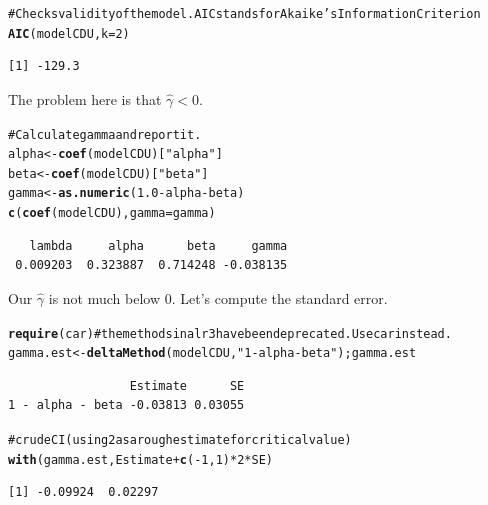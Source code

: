 \documentclass[10pt]{article}\usepackage{graphicx, color}
\makeatletter
\newcommand{\hlfunctioncall}[1]{\textcolor[rgb]{0.501960784313725,0,0.329411764705882}{\textbf{#1}}}%
\newcommand{\hlstring}[1]{\textcolor[rgb]{0.6,0.6,1}{#1}}%
\newcommand{\hlcomment}[1]{\textcolor[rgb]{0.180392156862745,0.6,0.341176470588235}{#1}}%
\newenvironment{kframe}{%
 \def\at@end@of@kframe{}%
 \ifinner\ifhmode%
  \def\at@end@of@kframe{\end{minipage}}%
  \begin{minipage}{\columnwidth}%
 \fi\fi%
 \def\FrameCommand##1{\hskip\@totalleftmargin \hskip-\fboxsep
 \colorbox{shadecolor}{##1}\hskip-\fboxsep
     \hskip-\linewidth \hskip-\@totalleftmargin \hskip\columnwidth}%
 \MakeFramed {\advance\hsize-\width
   \@totalleftmargin\z@ \linewidth\hsize
   \@setminipage}}%
 {\par\unskip\endMakeFramed%
 \at@end@of@kframe}
\newenvironment{knitrout}{}{} %
\makeatother
\begin{document}
\begin{knitrout}
\color{fgcolor}\begin{kframe}
\begin{alltt}
\hlcomment{# Checks validity of the model. AIC stands for Akaike's Information Criterion}
\hlfunctioncall{AIC}(modelCDU, k=2)
\end{alltt}
\begin{verbatim}
[1] -129.3
\end{verbatim}
\end{kframe}
\end{knitrout}


The problem here is that $\hat \gamma < 0$.
\begin{knitrout}
\color{fgcolor}\begin{kframe}
\begin{alltt}
\hlcomment{# Calculate gamma and report it.}
alpha <- \hlfunctioncall{coef}(modelCDU)[\hlstring{"alpha"}] 
beta <- \hlfunctioncall{coef}(modelCDU)[\hlstring{"beta"}] 
gamma <- \hlfunctioncall{as.numeric}(1.0 - alpha - beta)
\hlfunctioncall{c}(\hlfunctioncall{coef}(modelCDU), gamma=gamma)
\end{alltt}
\begin{verbatim}
   lambda     alpha      beta     gamma 
 0.009203  0.323887  0.714248 -0.038135 
\end{verbatim}
\end{kframe}
\end{knitrout}


Our $\hat\gamma$ is not much below $0$.  Let's compute the standard error.
\begin{knitrout}
\color{fgcolor}\begin{kframe}
\begin{alltt}
\hlfunctioncall{require}(car)  \hlcomment{# the methods in alr3 have been deprecated.  Use car instead.}
gamma.est <- \hlfunctioncall{deltaMethod}(modelCDU, \hlstring{"1-alpha-beta"}); gamma.est
\end{alltt}
\begin{verbatim}
                 Estimate      SE
1 - alpha - beta -0.03813 0.03055
\end{verbatim}
\begin{alltt}
\hlcomment{# crude CI (using 2 as a rough estimate for critical value)}
\hlfunctioncall{with}(gamma.est, Estimate + \hlfunctioncall{c}(-1,1) * 2 * SE)
\end{alltt}
\begin{verbatim}
[1] -0.09924  0.02297
\end{verbatim}
\end{kframe}
\end{knitrout}
\end{document}

